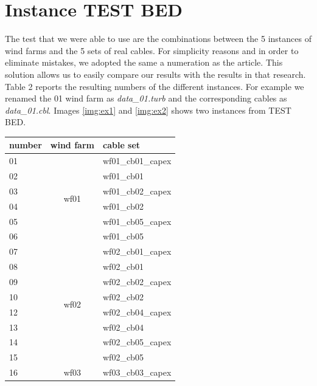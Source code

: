 \section{Instance TEST BED}
The test that we were able to use are the combinations between the 5 instances of wind farms and the 5 sets of real cables. For simplicity reasons and in order to eliminate mistakes, we adopted the same a numeration as the \cite{wfcp} article. This solution allows us to easily compare our results with the results in that research. 
Table 2 reports the resulting numbers of the different instances. For example we renamed the 01 wind farm as \textit{data\_01.turb} and the corresponding cables as \textit{data\_01.cbl}. Images \ref{img:ex1} and \ref{img:ex2} shows two instances from TEST BED.

\begin{table}[!htbp]\label{tab:testBed}
\center
\begin{tabular}{lcl}
\hline
number & \multicolumn{1}{l}{wind farm} & cable set         \\ \hline
01     & \multirow{6}{*}{wf01}         & wf01\_cb01\_capex \\
02     &                               & wf01\_cb01        \\
03     &                               & wf01\_cb02\_capex \\
04     &                               & wf01\_cb02        \\
05     &                               & wf01\_cb05\_capex \\
06     &                               & wf01\_cb05        \\ \hline
07     & \multirow{8}{*}{wf02}         & wf02\_cb01\_capex \\
08     &                               & wf02\_cb01        \\
09     &                               & wf02\_cb02\_capex \\
10     &                               & wf02\_cb02        \\
12     &                               & wf02\_cb04\_capex \\
13     &                               & wf02\_cb04        \\
14     &                               & wf02\_cb05\_capex \\
15     &                               & wf02\_cb05        \\ \hline
16     & \multirow{4}{*}{wf03}         & wf03\_cb03\_capex \\

\end{tabular}
\end{table}
